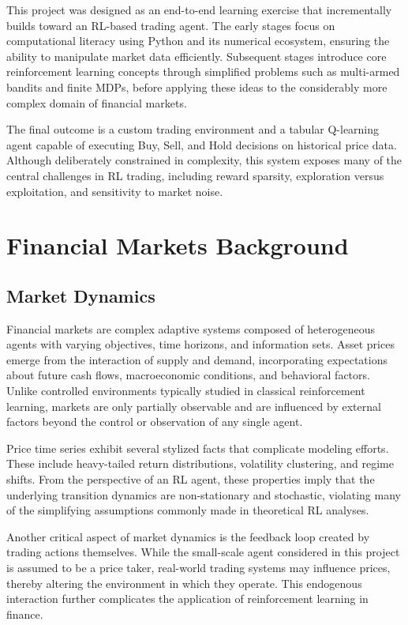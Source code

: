 \documentclass[12pt]{report}
\begin{document}
This project was designed as an end-to-end learning exercise that incrementally builds toward an RL-based trading agent. The early stages focus on computational literacy using Python and its numerical ecosystem, ensuring the ability to manipulate market data efficiently. Subsequent stages introduce core reinforcement learning concepts through simplified problems such as multi-armed bandits and finite MDPs, before applying these ideas to the considerably more complex domain of financial markets.

The final outcome is a custom trading environment and a tabular Q-learning agent capable of executing Buy, Sell, and Hold decisions on historical price data. Although deliberately constrained in complexity, this system exposes many of the central challenges in RL trading, including reward sparsity, exploration versus exploitation, and sensitivity to market noise.

\chapter{Financial Markets Background}

\section{Market Dynamics}

Financial markets are complex adaptive systems composed of heterogeneous agents with varying objectives, time horizons, and information sets. Asset prices emerge from the interaction of supply and demand, incorporating expectations about future cash flows, macroeconomic conditions, and behavioral factors. Unlike controlled environments typically studied in classical reinforcement learning, markets are only partially observable and are influenced by external factors beyond the control or observation of any single agent.

Price time series exhibit several stylized facts that complicate modeling efforts. These include heavy-tailed return distributions, volatility clustering, and regime shifts. From the perspective of an RL agent, these properties imply that the underlying transition dynamics are non-stationary and stochastic, violating many of the simplifying assumptions commonly made in theoretical RL analyses.

Another critical aspect of market dynamics is the feedback loop created by trading actions themselves. While the small-scale agent considered in this project is assumed to be a price taker, real-world trading systems may influence prices, thereby altering the environment in which they operate. This endogenous interaction further complicates the application of reinforcement learning in finance.
\end{document}
